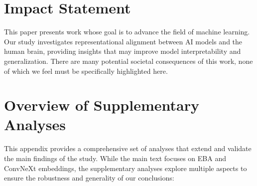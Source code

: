 \documentclass{article}
\theoremstyle{plain}
\theoremstyle{definition}
\theoremstyle{remark}
\begin{document}
\section*{Impact Statement}
This paper presents work whose goal is to advance the field of machine learning. 
Our study investigates representational alignment between AI models and the human brain, providing insights that may improve model interpretability and generalization.  
There are many potential societal consequences of this work, none of which we feel must be specifically highlighted here.





\newpage
\appendix
\onecolumn



\section{Overview of Supplementary Analyses}
\label{supple:overview}

This appendix provides a comprehensive set of analyses that extend and validate the main findings of the study. While the main text focuses on EBA and ConvNeXt embeddings, the supplementary analyses explore multiple aspects to ensure the robustness and generality of our conclusions:
\end{document}

